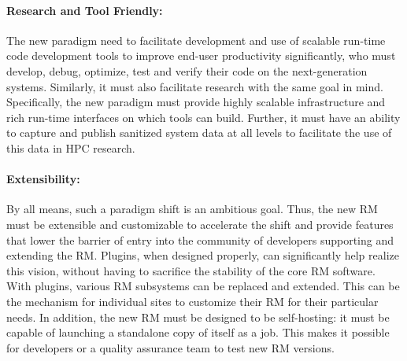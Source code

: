 \documentclass[10pt]{article}
\newcommand{\ngrm}{NGRM}
\begin{document}
\paragraph{Research and Tool Friendly:}
The new paradigm need to facilitate development and use of 
scalable run-time code development tools to improve end-user productivity
significantly, who must develop, debug, optimize, 
test and verify their code on the next-generation systems. 
Similarly, it must
also facilitate research with the same goal in mind.
Specifically, the new paradigm must provide highly scalable infrastructure
and rich run-time interfaces
on which tools can build. Further, it must have 
an ability to capture and publish sanitized system data at all levels to facilitate the use of
this data in HPC research. 


\paragraph{Extensibility:}
By all means, such a paradigm shift is an ambitious goal. Thus, 
the new RM must be extensible and customizable to accelerate the shift
and provide features that lower the barrier of entry into the
community of developers supporting and extending the RM.
Plugins, when designed properly, can significantly help realize this vision,
without having to sacrifice the stability of the core RM software. 
With plugins, various RM subsystems can be replaced and extended.  
This can be the mechanism for individual
sites to customize their RM for their particular needs. 
In addition, the new RM must be designed to be self-hosting: it must  
be capable of launching a standalone copy of itself as a job. This makes
it possible for developers or a quality assurance team to test new RM versions. 

%
\end{document}
